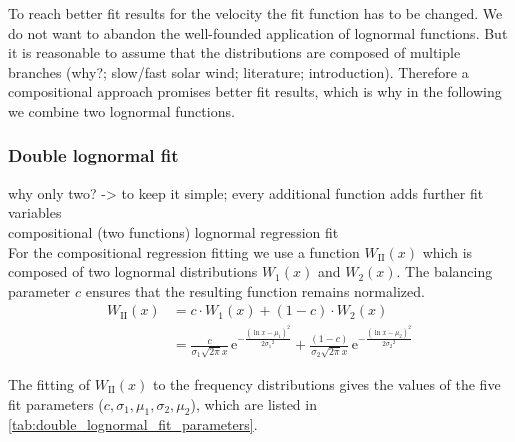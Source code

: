 To reach better fit results for the velocity the fit function has to be changed. We do not want to abandon the well-founded application of lognormal functions. But it is reasonable to assume that the distributions are composed of multiple branches (why?; slow/fast solar wind; literature; introduction). Therefore a compositional approach promises better fit results, which is why in the following we combine two lognormal functions.\\

\subsubsection{Double lognormal fit}
why only two? -> to keep it simple; every additional function adds further fit variables\\
compositional (two functions) lognormal regression fit\\

For the compositional regression fitting we use a function $W_\text{II}(x)$ which is composed of two lognormal distributions $W_1(x)$ and $W_2(x)$. The balancing parameter $c$ ensures that the resulting function remains normalized.
\begin{align}
	W_\text{II}(x) &= c \cdot W_1(x) + (1 -c) \cdot W_2(x)\\
	&= \frac{c}{\sigma_1 \sqrt{2 \pi} x} \, \text{e}^{- \frac{(\ln x - \mu_1)^2}{2 {\sigma_1}^2}} + \frac{(1 - c)}{\sigma_2 \sqrt{2 \pi} x} \, \text{e}^{- \frac{(\ln x - \mu_2)^2}{2 {\sigma_2}^2}} \label{eq:double_lognormal_fit_function}
\end{align}

The fitting of $W_\text{II}(x)$ to the frequency distributions gives the values of the five fit para\-meters ($c, \sigma_1, \mu_1, \sigma_2, \mu_2$), which are listed in \autoref{tab:double_lognormal_fit_parameters}.\\

